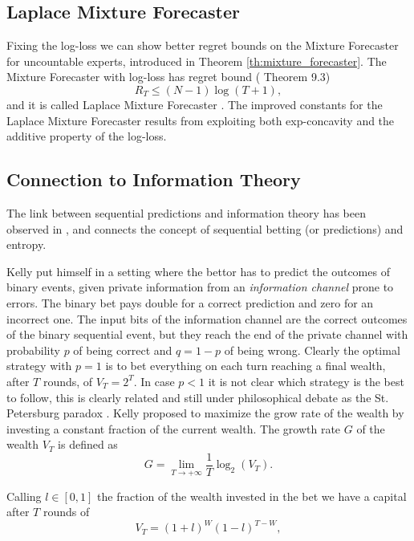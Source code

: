 \subsection{Laplace Mixture Forecaster}\label{sec:laplace_mixture}

Fixing the log-loss we can show better regret bounds on the Mixture Forecaster for uncountable experts, introduced in Theorem \ref{th:mixture_forecaster}. The Mixture Forecaster with log-loss has regret bound (\cite{cesa2006prediction} Theorem 9.3)
\begin{equation}
R_T\le(N-1)\log(T+1),
\end{equation}
and it is called Laplace Mixture Forecaster \cite{weinberger1994optimal}. The improved constants for the Laplace Mixture Forecaster results from exploiting both exp-concavity and the additive property of the log-loss.

\subsection{Connection to Information Theory}\label{sec:Info} 

The link between sequential predictions and information theory has been observed in \cite{kelly2011new}, and connects the concept of sequential betting (or predictions) and entropy.

Kelly put himself in a setting where the bettor has to predict the outcomes of binary events, given private information from an \emph{information channel} prone to errors. The binary bet pays double for a correct prediction and zero for an incorrect one. The input bits of the information channel are the correct outcomes of the binary sequential event, but they reach the end of the private channel with probability $p$ of being correct and $q=1-p$ of being wrong. Clearly the optimal strategy with $p=1$ is to bet everything on each turn reaching a final wealth, after $T$ rounds, of $V_T=2^T$. In case $p<1$ it is not clear which strategy is the best to follow, this is clearly related and still under philosophical debate as the St. Petersburg paradox \cite{samuelson1977st}. Kelly proposed to maximize the grow rate of the wealth by investing a constant fraction of the current wealth. The growth rate $G$ of the wealth $V_T$ is defined as 
$$G=\lim\limits_{T\to+\infty}\frac{1}{T}\log_2(V_T).$$

Calling $l\in[0,1]$ the fraction of the wealth invested in the bet we have a capital after $T$ rounds of 
$$V_T=(1+l)^{W}(1-l)^{T-W},$$ 

